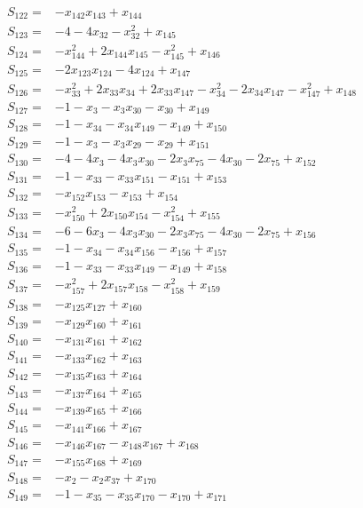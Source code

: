 \begin{align*}
S_{122}={}&-x_{142}x_{143}+x_{144}\\[3pt]
S_{123}={}&-4-4x_{32}-x_{32}^{2}+x_{145}\\[3pt]
S_{124}={}&-x_{144}^{2}+2x_{144}x_{145}-x_{145}^{2}+x_{146}\\[3pt]
S_{125}={}&-2x_{123}x_{124}-4x_{124}+x_{147}\\[3pt]
S_{126}={}&-x_{33}^{2}+2x_{33}x_{34}+2x_{33}x_{147}-x_{34}^{2}-2x_{34}x_{147}-x_{147}^{2}+x_{148}\\[3pt]
S_{127}={}&-1-x_{3}-x_{3}x_{30}-x_{30}+x_{149}\\[3pt]
S_{128}={}&-1-x_{34}-x_{34}x_{149}-x_{149}+x_{150}\\[3pt]
S_{129}={}&-1-x_{3}-x_{3}x_{29}-x_{29}+x_{151}\\[3pt]
S_{130}={}&-4-4x_{3}-4x_{3}x_{30}-2x_{3}x_{75}-4x_{30}-2x_{75}+x_{152}\\[3pt]
S_{131}={}&-1-x_{33}-x_{33}x_{151}-x_{151}+x_{153}\\[3pt]
S_{132}={}&-x_{152}x_{153}-x_{153}+x_{154}\\[3pt]
S_{133}={}&-x_{150}^{2}+2x_{150}x_{154}-x_{154}^{2}+x_{155}\\[3pt]
S_{134}={}&-6-6x_{3}-4x_{3}x_{30}-2x_{3}x_{75}-4x_{30}-2x_{75}+x_{156}\\[3pt]
S_{135}={}&-1-x_{34}-x_{34}x_{156}-x_{156}+x_{157}\\[3pt]
S_{136}={}&-1-x_{33}-x_{33}x_{149}-x_{149}+x_{158}\\[3pt]
S_{137}={}&-x_{157}^{2}+2x_{157}x_{158}-x_{158}^{2}+x_{159}\\[3pt]
S_{138}={}&-x_{125}x_{127}+x_{160}\\[3pt]
S_{139}={}&-x_{129}x_{160}+x_{161}\\[3pt]
S_{140}={}&-x_{131}x_{161}+x_{162}\\[3pt]
S_{141}={}&-x_{133}x_{162}+x_{163}\\[3pt]
S_{142}={}&-x_{135}x_{163}+x_{164}\\[3pt]
S_{143}={}&-x_{137}x_{164}+x_{165}\\[3pt]
S_{144}={}&-x_{139}x_{165}+x_{166}\\[3pt]
S_{145}={}&-x_{141}x_{166}+x_{167}\\[3pt]
S_{146}={}&-x_{146}x_{167}-x_{148}x_{167}+x_{168}\\[3pt]
S_{147}={}&-x_{155}x_{168}+x_{169}\\[3pt]
S_{148}={}&-x_{2}-x_{2}x_{37}+x_{170}\\[3pt]
S_{149}={}&-1-x_{35}-x_{35}x_{170}-x_{170}+x_{171}\\[3pt]

\end{align*}

